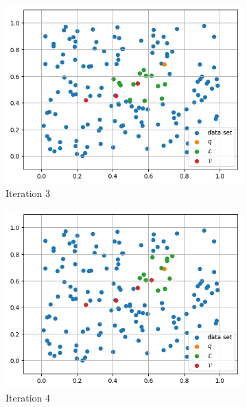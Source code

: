 \begin{figure}[ht]
    \hfill
    \begin{subfigure}{0.31\textwidth}
        \includegraphics[width=\textwidth]{images/greedy-search-3}
        \caption{Iteration 3}
        \label{fig:gs3}
    \end{subfigure}
    \hfill
    \begin{subfigure}{0.31\textwidth}
        \includegraphics[width=\textwidth]{images/greedy-search-4}
        \caption{Iteration 4}
        \label{fig:gs4}
    \end{subfigure}
    \hfill
    \begin{subfigure}{0.31\textwidth}

\end{subfigure}
\end{figure}
